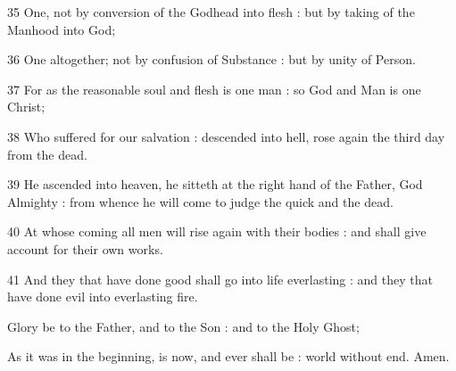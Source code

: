 35 One, not by conversion of the Godhead into flesh : but by taking of the Manhood into God;

36 One altogether; not by confusion of Substance : but by unity of Person.

37 For as the reasonable soul and flesh is one man : so God and Man is one Christ;

38 Who suffered for our salvation : descended into hell, rose again the third day from the dead.

39 He ascended into heaven, he sitteth at the right hand of the Father, God Almighty : from whence he will come to judge the quick and the dead.

40 At whose coming all men will rise again with their bodies : and shall give account for their own works.

41 And they that have done good shall go into life everlasting : and they that have done evil into everlasting fire.


Glory be to the Father, and to the Son : and to the Holy Ghost;

As it was in the beginning, is now, and ever shall be : world without end. Amen.

\fleuron